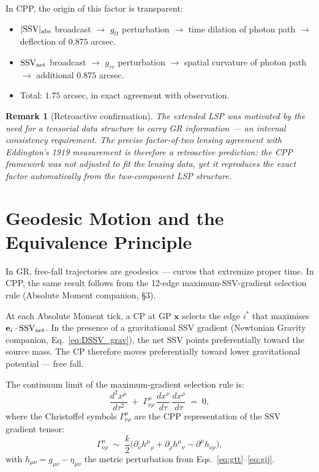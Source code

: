 \documentclass[12pt]{article}
\newtheorem{remark}[theorem]{Remark}
\newcommand{\SSV}{\text{SSV}}
\newcommand{\gmn}{g_{\mu\nu}}
\begin{document}
In CPP, the origin of this factor is transparent:
\begin{itemize}[noitemsep]
  \item $|\SSV|_{\rm abs}$ broadcast $\to$ $g_{tt}$ perturbation
    $\to$ time dilation of photon path $\to$ deflection of $0.875$ arcsec.
  \item $\mathbf{\SSV}_{\rm net}$ broadcast $\to$ $g_{rr}$ perturbation
    $\to$ spatial curvature of photon path $\to$ additional $0.875$ arcsec.
  \item Total: $1.75$ arcsec, in exact agreement with observation.
\end{itemize}

\begin{remark}[Retroactive confirmation]
The extended LSP was motivated by the need for a tensorial data structure
to carry GR information --- an internal consistency requirement.  The
precise factor-of-two lensing agreement with Eddington's 1919 measurement
is therefore a \emph{retroactive} prediction: the CPP framework was not
adjusted to fit the lensing data, yet it reproduces the exact factor
automatically from the two-component LSP structure.
\end{remark}

\section{Geodesic Motion and the Equivalence Principle}
\label{sec:geodesic}

In GR, free-fall trajectories are geodesics — curves that extremize
proper time.  In CPP, the same result follows from the 12-edge maximum-SSV-gradient
selection rule (Absolute Moment companion, \S3).

At each Absolute Moment tick, a CP at GP $\mathbf{x}$ selects the
edge $i^*$ that maximises $\mathbf{e}_i \cdot \mathbf{\SSV}_{\rm net}$.
In the presence of a gravitational SSV gradient (Newtonian Gravity
companion, Eq.~\ref{eq:DSSV_grav}), the net SSV points preferentially
toward the source mass.  The CP therefore moves preferentially toward
lower gravitational potential — free fall.

The continuum limit of the maximum-gradient selection rule is:
\begin{equation}
  \frac{d^2 x^\mu}{d\tau^2}
  \;+\; \Gamma^\mu_{\nu\rho}\,\frac{dx^\nu}{d\tau}\,\frac{dx^\rho}{d\tau}
  \;=\; 0,
  \label{eq:geodesic}
\end{equation}
where the Christoffel symbols $\Gamma^\mu_{\nu\rho}$ are the CPP
representation of the SSV gradient tensor:
\begin{equation}
  \Gamma^\mu_{\nu\rho} \;\sim\;
  \frac{k}{2}\bigl(\partial_\nu h^\mu{}_\rho
  + \partial_\rho h^\mu{}_\nu
  - \partial^\mu h_{\nu\rho}\bigr),
  \label{eq:Christoffel}
\end{equation}
with $h_{\mu\nu} = \gmn - \eta_{\mu\nu}$ the metric perturbation from
Eqs.~\eqref{eq:gtt}--\eqref{eq:gij}.
\end{document}
